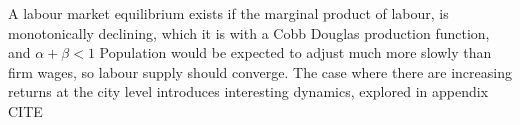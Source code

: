 A labour market equilibrium exists if the marginal product of labour, is monotonically declining, which it is with a Cobb Douglas production function, and $\alpha + \beta<1$ 
Population would be expected to adjust much more slowly than firm wages, so labour supply should converge. The case where there are increasing returns at the city level introduces interesting dynamics, explored in appendix CITE %


